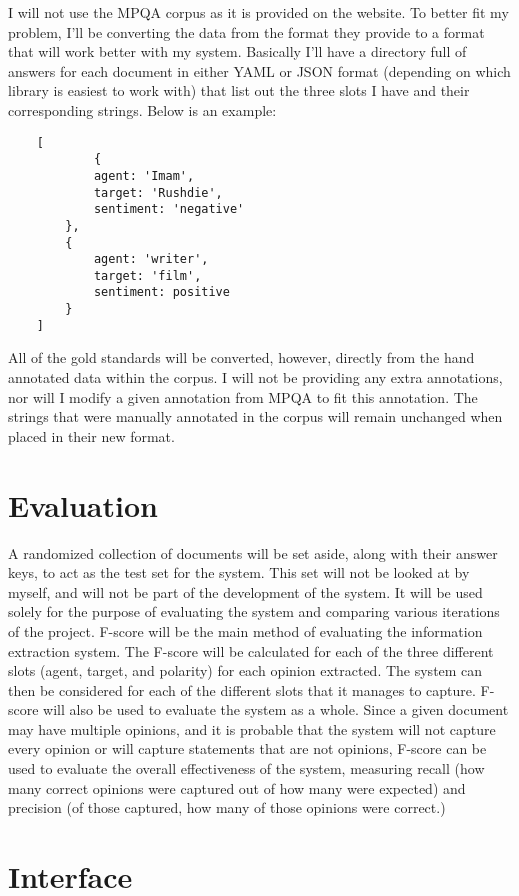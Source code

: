 \documentclass{article}
\begin{document}
    I will not use the MPQA corpus as it is provided on the website. To better fit my problem, I'll be converting the data from the format they provide to a format that will work better with my system. Basically I'll have a directory full of answers for each document in either YAML or JSON format (depending on which library is easiest to work with) that list out the three slots I have and their corresponding strings. Below is an example:\\
    \begin{lstlisting}
	[
    		{
			agent: 'Imam',
			target: 'Rushdie',
			sentiment: 'negative'
		},
		{
			agent: 'writer',
			target: 'film',
			sentiment: positive
		}
	]
    \end{lstlisting}

    All of the gold standards will be converted, however, directly from the hand annotated data within the corpus. I will not be providing any extra annotations, nor will I modify a given annotation from MPQA to fit this annotation. The strings that were manually annotated in the corpus will remain unchanged when placed in their new format.

    \section{Evaluation}

    A randomized collection of documents will be set aside, along with their answer keys, to act as the test set for the system. This set will not be looked at by myself, and will not be part of the development of the system. It will be used solely for the purpose of evaluating the system and comparing various iterations of the project.
    F-score will be the main method of evaluating the information extraction system. The F-score will be calculated for each of the three different slots (agent, target, and polarity) for each opinion extracted. The system can then be considered for each of the different slots that it manages to capture.
    F-score will also be used to evaluate the system as a whole. Since a given document may have multiple opinions, and it is probable that the system will not capture every opinion or will capture statements that are not opinions, F-score can be used to evaluate the overall effectiveness of the system, measuring recall (how many correct opinions were captured out of how many were expected) and precision (of those captured, how many of those opinions were correct.)

    \section{Interface}
\end{document}
